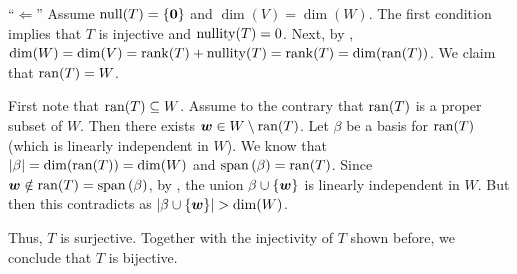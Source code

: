 \begin{enumerate}
\begin{pf}
``\(\Leftarrow\)'' Assume \(\operatorname{null}(T)=\{\vb*{0}\}\) and \(\dim(V)=\dim(W)\). The
first condition implies that \(T\) is injective and \(\operatorname{nullity}(T)=0\). Next, by
, \(\dim(W)=\dim(V)=\operatorname{rank}(T)+\operatorname{nullity}(T)=\operatorname{rank}(T)=\dim(\operatorname{ran}(T))\).
We claim that \(\operatorname{ran}(T)=W\).

\begin{pf}
First note that \(\operatorname{ran}(T)\subseteq W\). Assume to the contrary that \(\operatorname{ran}(T)\)
is a proper subset of \(W\). Then there exists \(\vb*{w}\in
W\setminus\operatorname{ran}(T)\).  Let \(\beta\) be a basis for \(\operatorname{ran}(T)\) (which is
linearly independent in \(W\)). We know that \(|\beta|=\dim(\operatorname{ran}(T))=\dim(W)\)
and \(\operatorname{span}\qty(\beta)=\operatorname{ran}(T)\). Since \(\vb*{w}\notin\operatorname{ran}(T)=\operatorname{span}\qty(\beta)\), by
, the union \(\beta\cup\{\vb*{w}\}\) is linearly
independent in \(W\). But then this contradicts  as
\(|\beta\cup\{\vect{w}\}|>\dim(W)\).
\end{pf}

Thus, \(T\) is surjective. Together with the injectivity of \(T\) shown
before, we conclude that \(T\) is bijective.
\end{pf}
\end{enumerate}
